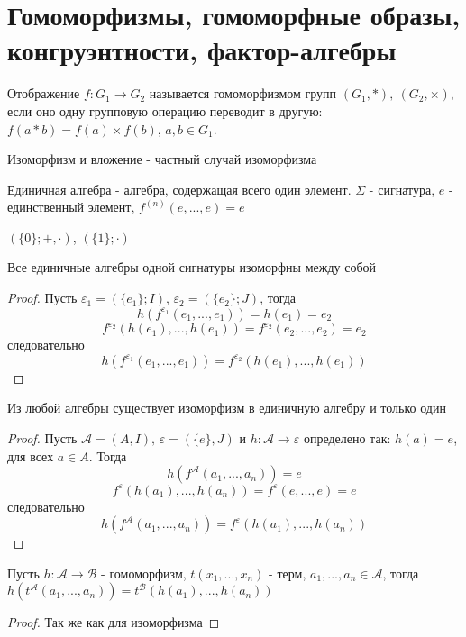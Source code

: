 \documentclass[../main/document.tex]{subfiles}
\begin{document}
\section{Гомоморфизмы, гомоморфные образы,\\ конгруэнтности, фактор-алгебры}
\begin{dfn}[Гомоморфизм]\label{homomorphism}
Отображение $f \colon G_1 \to G_2$ называется гомоморфизмом групп $(G_1,*), ~(G_2,\times)$, если оно одну групповую операцию переводит в другую: $f(a*b)=f(a)\times f(b),\, a,b\in G_1$.
\end{dfn}
\begin{cnsq}
Изоморфизм и вложение - частный случай изоморфизма
\end{cnsq}
\begin{dfn}
Единичная алгебра - алгебра, содержащая всего один элемент. $\Sigma$ - сигнатура, $e$ - единственный элемент, $f^{(n)}(e,...,e)=e$
\end{dfn}
\begin{exm}
$(\{0\};+,\cdot)$, $(\{1\};\cdot)$
\end{exm}
\begin{cnsq}
Все единичные алгебры одной сигнатуры изоморфны между собой
\begin{proof}
Пусть $\varepsilon_1=(\{e_1\};I)$, $\varepsilon_2=(\{e_2\};J)$, тогда
$$h(f^{\varepsilon_1}(e_1,...,e_1))=h(e_1)=e_2$$
$$f^{\varepsilon_2}(h(e_1),...,h(e_1))=f^{\varepsilon_2}(e_2,...,e_2)=e_2$$
следовательно
$$h(f^{\varepsilon_1}(e_1,...,e_1))=f^{\varepsilon_2}(h(e_1),...,h(e_1))$$
\end{proof}
\end{cnsq}
\begin{thm}
Из любой алгебры существует изоморфизм в единичную алгебру и только один
\begin{proof}
Пусть $\mathcal{A}=(A,I),\, \varepsilon=(\{e\},J)$ и $h:\mathcal{A}\to\varepsilon$ определено так: $h(a)=e$, для всех $a\in A$. Тогда
$$h(f^{\mathcal{A}}(a_1,...,a_n))=e$$
$$f^{\varepsilon}(h(a_1),...,h(a_n))=f^{\varepsilon}(e,...,e)=e$$
следовательно
$$h(f^{\mathcal{A}}(a_1,...,a_n))=f^{\varepsilon}(h(a_1),...,h(a_n))$$
\end{proof}
\end{thm}
\begin{thm}
Пусть $h:\mathcal{A}\to \mathcal{B}$ - гомоморфизм, $t(x_1,...,x_n)$ - терм, $a_1,...,a_n\in\mathcal{A} $, тогда $h(t^{\mathcal{A}}(a_1,...,a_n))=t^{\mathcal{B}}(h(a_1),...,h(a_n))$
\begin{proof}
Так же как для изоморфизма
\end{proof}
\end{thm}
\end{document}
